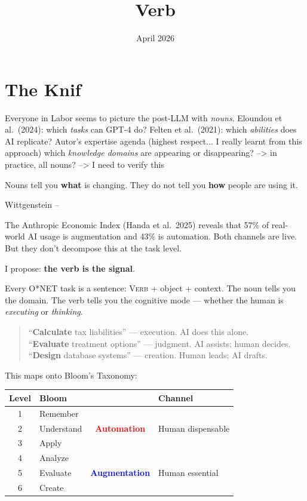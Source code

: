 \documentclass[11pt]{article}
\title{Verb}
\date{April 2026}
\begin{document}
\maketitle
\thispagestyle{empty}
\onehalfspacing

\section*{The Knif}

Everyone in Labor seems to picture the post-LLM with \emph{nouns}.
Eloundou et al.\ (2024): which \emph{tasks} can GPT-4 do?
Felten et al.\ (2021): which \emph{abilities} does AI replicate?
Autor's expertise agenda (highest respect... I really learnt from this approach) which \emph{knowledge domains} are appearing or disappearing? --> in practice, all nouns? --> I need to verify this

Nouns tell you \textbf{what} is changing.
They do not tell you \textbf{how} people are using it. 

Wittgenstein -- 

The Anthropic Economic Index (Handa et al.\ 2025) reveals that 57\% of
real-world AI usage is augmentation and 43\% is automation.
Both channels are live.  But they don't decompose this at the task level.

\medskip
\noindent I propose: \textbf{the verb is the signal}.

Every O*NET task is a sentence: \textsc{Verb} + object + context.
The noun tells you the domain.  The verb tells you the cognitive mode ---
whether the human is \emph{executing} or \emph{thinking}.

\begin{quote}
\small
``\textbf{Calculate} tax liabilities'' --- execution. AI does this alone.\\
``\textbf{Evaluate} treatment options'' --- judgment. AI assists; human decides.\\
``\textbf{Design} database systems'' --- creation. Human leads; AI drafts.
\end{quote}

This maps onto Bloom's Taxonomy:

\begin{center}
\begin{tabular}{clcl}
\toprule
Level & Bloom & & Channel \\
\midrule
1 & Remember    & \multirow{3}{*}{\textcolor{red}{\textbf{Automation}}} & \multirow{3}{*}{Human dispensable} \\
2 & Understand  & & \\
3 & Apply       & & \\
\midrule
4 & Analyze     & \multirow{3}{*}{\textcolor{blue}{\textbf{Augmentation}}} & \multirow{3}{*}{Human essential} \\
5 & Evaluate    & & \\
6 & Create      & & \\
\bottomrule
\end{tabular}
\end{center}
\end{document}
